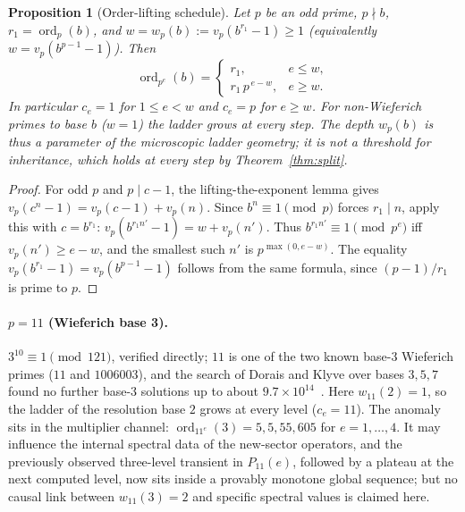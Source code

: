 \documentclass[11pt]{article}
\newtheorem{proposition}[theorem]{Proposition}
\theoremstyle{definition}
\theoremstyle{remark}
\newcommand{\ord}{\operatorname{ord}}
\begin{document}
\begin{proposition}[Order-lifting schedule]\label{prop:lte}
Let $p$ be an odd prime, $p\nmid b$, $r_1=\ord_p(b)$, and $w=w_p(b):=v_p(b^{r_1}-1)\ge1$ (equivalently $w=v_p(b^{p-1}-1)$). Then
\[
\ord_{p^e}(b)=\begin{cases} r_1, & e\le w,\\ r_1\,p^{\,e-w}, & e\ge w.\end{cases}
\]
In particular $c_e=1$ for $1\le e<w$ and $c_e=p$ for $e\ge w$. For non-Wieferich primes to base $b$ ($w=1$) the ladder grows at every step. The depth $w_p(b)$ is thus a parameter of the microscopic ladder geometry; it is not a threshold for inheritance, which holds at every step by Theorem~\ref{thm:split}.
\end{proposition}

\begin{proof}
For odd $p$ and $p\mid c-1$, the lifting-the-exponent lemma gives $v_p(c^n-1)=v_p(c-1)+v_p(n)$. Since $b^n\equiv1\pmod p$ forces $r_1\mid n$, apply this with $c=b^{r_1}$: $v_p(b^{r_1n'}-1)=w+v_p(n')$. Thus $b^{r_1n'}\equiv1\pmod{p^e}$ iff $v_p(n')\ge e-w$, and the smallest such $n'$ is $p^{\max(0,e-w)}$. The equality $v_p(b^{r_1}-1)=v_p(b^{p-1}-1)$ follows from the same formula, since $(p-1)/r_1$ is prime to $p$.
\end{proof}

\paragraph{$p=11$ (Wieferich base 3).}
$3^{10}\equiv1\pmod{121}$, verified directly; $11$ is one of the two known base-3 Wieferich primes ($11$ and $1006003$), and the search of Dorais and Klyve over bases $3,5,7$ found no further base-3 solutions up to about $9.7\times10^{14}$~\cite{Montgomery1993,DoraisKlyve2011}. Here $w_{11}(2)=1$, so the ladder of the resolution base $2$ grows at every level ($c_e=11$). The anomaly sits in the multiplier channel: $\ord_{11^e}(3)=5,5,55,605$ for $e=1,\dots,4$. It may influence the internal spectral data of the new-sector operators, and the previously observed three-level transient in $P_{11}(e)$, followed by a plateau at the next computed level, now sits inside a provably monotone global sequence; but no causal link between $w_{11}(3)=2$ and specific spectral values is claimed here.
\end{document}
